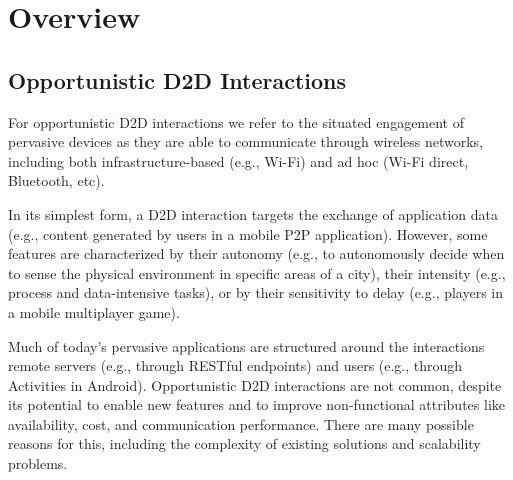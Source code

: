 \section{Overview}\label{sec:overview}

\subsection{Opportunistic D2D Interactions}

For opportunistic D2D interactions we refer to the situated engagement of pervasive devices as they are able to communicate through wireless networks, including both infrastructure-based (e.g., Wi-Fi) and ad hoc (Wi-Fi direct, Bluetooth, etc). 

In its simplest form, a D2D interaction targets the exchange of application data (e.g., content generated by users in a mobile P2P application). However, some features are characterized by their autonomy 
(e.g., to autonomously decide when to sense the physical environment in specific areas of a city), their intensity (e.g., process and data-intensive tasks), or by their sensitivity to delay (e.g., players in a mobile multiplayer game). 

Much of today's pervasive applications are structured around the interactions remote servers (e.g., through RESTful endpoints) and users (e.g., through Activities in Android). %
Opportunistic D2D interactions are not common, despite its potential to enable new features and to improve non-functional attributes like availability, cost, and communication performance. There are many possible reasons for this, including the complexity of existing solutions and scalability problems.

